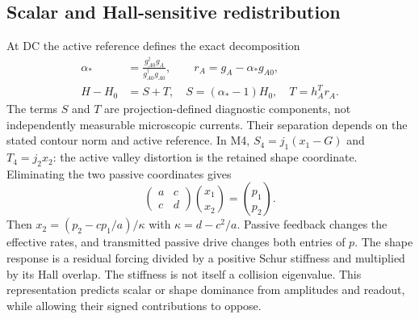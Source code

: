 \subsection{Scalar and Hall-sensitive redistribution}
At DC the active reference defines the exact decomposition
\begin{align}
\alpha_*&=\frac{g_{A0}^\dagger g_A}{g_{A0}^\dagger g_{A0}},\qquad r_A=g_A-\alpha_*g_{A0},\nonumber\\
H-H_0&=S+T,\quad S=(\alpha_*-1)H_0,\quad T=h_A^Tr_A.\label{eq:ST}
\end{align}
The terms $S$ and $T$ are projection-defined diagnostic components, not independently measurable microscopic currents. Their separation depends on the stated contour norm and active reference. In M4, $S_4=j_1(x_1-G)$ and $T_4=j_2x_2$: the active valley distortion is the retained shape coordinate. Eliminating the two passive coordinates gives
\begin{equation}
\begin{pmatrix}a&c\\c&d\end{pmatrix}\binom{x_1}{x_2}
=\binom{p_1}{p_2}.\label{eq:shapeamp}
\end{equation}
Then $x_2=(p_2-cp_1/a)/\kappa$ with $\kappa=d-c^2/a$. Passive feedback changes the effective rates, and transmitted passive drive changes both entries of $p$. The shape response is a residual forcing divided by a positive Schur stiffness and multiplied by its Hall overlap. The stiffness is not itself a collision eigenvalue. This representation predicts scalar or shape dominance from amplitudes and readout, while allowing their signed contributions to oppose.
